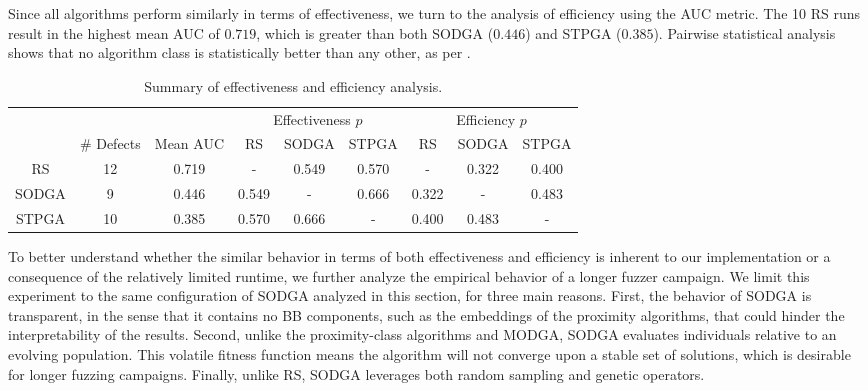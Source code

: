 Since all algorithms perform similarly in terms of effectiveness,
we turn to the analysis of efficiency using the \gls{AUC} metric.
The 10 \gls{RS} runs result in the highest mean \gls{AUC} of $0.719$,
which is greater than both \gls{SODGA} ($0.446$) and \gls{STPGA} ($0.385$).
Pairwise statistical analysis shows that no algorithm class is 
statistically better than any other, as per .

\begin{table}[h]
    \centering
    \begin{tabular}{c|cc|ccc|ccc}
        &&&\multicolumn{3}{c}{Effectiveness $p$}&\multicolumn{3}{c}{Efficiency $p$}\\
        &\# Defects&Mean \gls{AUC}&\gls{RS} & \gls{SODGA} & \gls{STPGA}&\gls{RS} & \gls{SODGA} & \gls{STPGA}\\
        \midrule
        \gls{RS} &12&0.719 & - & 0.549 & 0.570 & - & 0.322 & 0.400 \\
        \gls{SODGA} &9&0.446&0.549 & - & 0.666 & 0.322 &-& 0.483\\
        \gls{STPGA} &10&0.385& 0.570 & 0.666& - & 0.400 & 0.483 & -\\
    \end{tabular}
    \caption{Summary of effectiveness and efficiency analysis.}
    \label{tab:rq2stats}
\end{table}

To better understand whether the similar behavior in terms of both
effectiveness and efficiency is inherent to our implementation or
a consequence of the relatively limited runtime, we further analyze the empirical behavior
of a longer fuzzer campaign.
We limit this experiment to the same configuration of \gls{SODGA} analyzed
in this section, for three main reasons.
First, the behavior of \gls{SODGA} is transparent, in the sense that it contains no
\gls{BB} components, such as the embeddings of the proximity algorithms, that
could hinder the interpretability of the results.
Second, unlike the proximity-class algorithms and \gls{MODGA}, \gls{SODGA}
evaluates individuals relative to an evolving population.
This volatile fitness function means the algorithm will not converge
upon a stable set of solutions, which is desirable for longer fuzzing campaigns.
Finally, unlike \gls{RS}, \gls{SODGA} leverages both random sampling and genetic operators.

